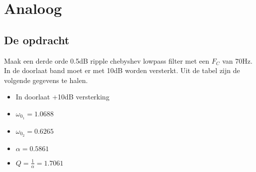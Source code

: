 \section{Analoog}
\subsection{De opdracht}
\begin{minipage}{0.45\textwidth}
	Maak een derde orde 0.5dB ripple chebyshev lowpass filter met een $F_C$ van 70Hz. In de doorlaat band 
	moet er met 10dB worden versterkt. Uit de tabel zijn de volgende gegevens te halen.
\end{minipage}
\hfill
\begin{minipage}{0.45\textwidth}
	\begin{itemize}
		\item In doorlaat +10dB versterking
		\item $\omega_{0_1}=1.0688$ 
		\item $\omega_{0_2}=0.6265$
		\item $\alpha = 0.5861$
		\item $Q=\frac{1}{\alpha}=1.7061$
	\end{itemize} %
\end{minipage}

